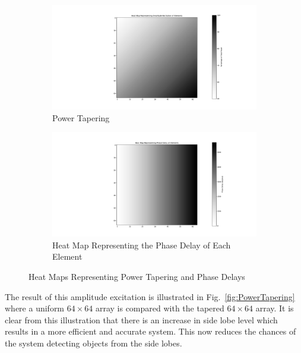 \documentclass[11pt]{witseiepaper}
\begin{document}
\begin{figure}[htb]
    \centering
    \begin{subfigure}{.5\textwidth}
        \centering
            \includegraphics[width=0.9\linewidth]{PowerTapering.pdf}
            \caption{Power Tapering}
            \label{fig:PowerTaperingHeatMap}
        \end{subfigure}%
        \begin{subfigure}{.5\textwidth}
            \centering
            \includegraphics[width=0.9\linewidth]{PhasingHeatMap.pdf}
            \caption{Heat Map Representing the Phase Delay of Each Element}
                \label{fig:PhasingHeatMap}
            \end{subfigure}
\caption{Heat Maps Representing Power Tapering and Phase Delays}
\label{fig:HeatMaps}
\end{figure}

The result of this amplitude excitation is illustrated in Fig.~\ref{fig:PowerTapering} where a uniform $64 \times 64$ array is compared with the tapered $64 \times 64$ array. It is clear from this illustration that there is an increase in side lobe level which results in a more efficient and accurate system. This now reduces the chances of the system detecting objects from the side lobes. 
\end{document}
